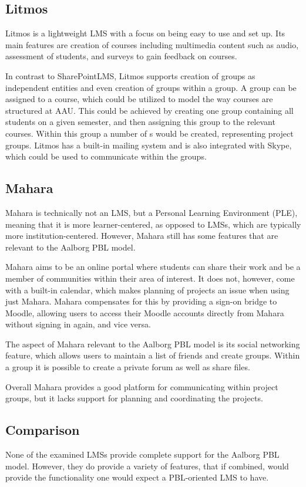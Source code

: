 \subsection{Litmos}
Litmos \citep{litmos} is a lightweight LMS with a focus on being easy to use and set up.
Its main features are creation of courses including multimedia content such as audio, assessment of students, and surveys to gain feedback on courses.

In contrast to SharePointLMS, Litmos supports creation of groups as independent entities and even creation of groups within a group.
A group can be assigned to a course, which could be utilized to model the way courses are structured at AAU.
This could be achieved by creating one group containing all students on a given semester, and then assigning this group to the relevant courses.
Within this group a number of \subgroup{}s would be created, representing project groups.
Litmos has a built-in mailing system and is also integrated with Skype, which could be used to communicate within the groups.


\subsection{Mahara}
Mahara \citep{mahara} is technically not an LMS, but a Personal Learning Environment (PLE), meaning that it is more learner-centered, as opposed to LMSs, which are typically more institution-centered.
However, Mahara still has some features that are relevant to the Aalborg PBL model.

Mahara aims to be an online portal where students can share their work and be a member of communities within their area of interest.
It does not, however, come with a built-in calendar, which makes planning of projects an issue when using just Mahara.
Mahara compensates for this by providing a sign-on bridge to Moodle, allowing users to access their Moodle accounts directly from Mahara without signing in again, and vice versa.

The aspect of Mahara relevant to the Aalborg PBL model is its social networking feature, which allows users to maintain a list of friends and create groups.
Within a group it is possible to create a private forum as well as share files.

Overall Mahara provides a good platform for communicating within project groups, but it lacks support for planning and coordinating the projects.

\subsection{Comparison}
None of the examined LMSs provide complete support for the Aalborg PBL model.
However, they do provide a variety of features, that if combined, would provide the functionality one would expect a PBL-oriented LMS to have.

